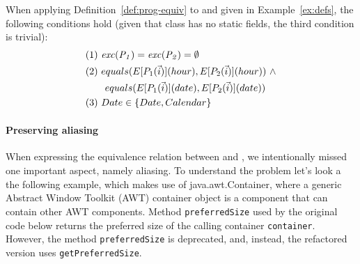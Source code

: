\documentclass[sigconf,review,anonymous]{acmart}
\begin{document}
\begin{example}\label{ex:equiv}
  When applying Definition~\ref{def:prog-equiv} to  and  given in Example~\ref{ex:defs},
  the following conditions hold (given that class  has no static fields, the third condition is trivial):
\[
\begin{aligned}
      & (1)~ \var{exc(P_1)}=\var{exc(P_2)} =\emptyset\\
      & (2)~ equals(E[P_1(\vec{i})](hour), E[P_2(\vec{i})](hour)) ~ \wedge\\ %
      & \qquad equals(E[P_1(\vec{i})](date), E[P_2(\vec{i})](date))\\
& (3)~  Date \in \{Date, Calendar\}
    \end{aligned}
    \]

 
    
\end{example}


\paragraph{Preserving aliasing}

When expressing the equivalence relation between  and , we
intentionally missed one important aspect, namely aliasing.  To understand
the problem let's look a the following example, which makes use of
java.awt.Container, where a generic Abstract Window Toolkit (AWT) container
object is a component that can contain other AWT components.  Method
\texttt{preferredSize} used by the original code below returns the preferred
size of the calling container \texttt{container}.  However, the method
\texttt{preferredSize} is deprecated, and, instead, the refactored version
uses \texttt{getPreferredSize}.
\end{document}
